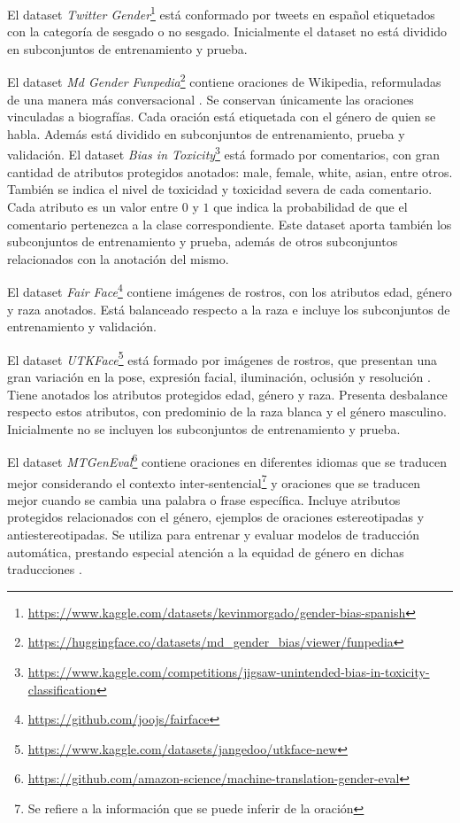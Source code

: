     El dataset \textit{Twitter Gender}\footnote{\url{https://www.kaggle.com/datasets/kevinmorgado/gender-bias-spanish}} est\'a conformado por 
    tweets en espa\~nol etiquetados con la categor\'ia de sesgado o no sesgado. Inicialmente el dataset no est\'a dividido en subconjuntos de 
    entrenamiento y prueba.

    El dataset \textit{Md Gender Funpedia}\footnote{\url{https://huggingface.co/datasets/md_gender_bias/viewer/funpedia}} contiene oraciones de 
    Wikipedia, reformuladas de una manera m\'as conversacional \parencite{dinan2020multidimensional}. Se conservan \'unicamente las oraciones 
    vinculadas a biograf\'ias. Cada oraci\'on est\'a etiquetada con el g\'enero de quien se habla. Adem\'as est\'a dividido en subconjuntos de 
    entrenamiento, prueba y validaci\'on.
    El dataset \textit{Bias in Toxicity}\footnote{\url{https://www.kaggle.com/competitions/jigsaw-unintended-bias-in-toxicity-classification}}
    est\'a formado por comentarios, con gran cantidad de atributos protegidos anotados: male, female, white, asian, entre otros. Tambi\'en se 
    indica el nivel de toxicidad y toxicidad severa de cada comentario. Cada atributo es un valor entre $0$ y $1$ que indica la probabilidad de 
    que el comentario pertenezca a la clase correspondiente. Este dataset aporta tambi\'en los subconjuntos de entrenamiento y prueba, adem\'as 
    de otros subconjuntos relacionados con la anotaci\'on del mismo.  

    El dataset \textit{Fair Face}\footnote{\url{https://github.com/joojs/fairface}} contiene im\'agenes de rostros, con los atributos edad, 
    g\'enero y raza anotados. Est\'a balanceado respecto a la raza \parencite{karkkainenfairface} e incluye los subconjuntos de entrenamiento y 
    validaci\'on.

    El dataset \textit{UTKFace}\footnote{\url{https://www.kaggle.com/datasets/jangedoo/utkface-new}} est\'a formado por im\'agenes de rostros, que 
    presentan una gran variaci\'on en la pose, expresi\'on facial, iluminaci\'on, oclusi\'on y resoluci\'on \parencite{zhang2017age}. 
    Tiene anotados los atributos protegidos edad, g\'enero y raza. Presenta desbalance respecto estos atributos, con predominio de la raza 
    blanca y el g\'enero masculino. Inicialmente no se incluyen los subconjuntos de entrenamiento y prueba.

    El dataset \textit{MTGenEval}\footnote{\url{https://github.com/amazon-science/machine-translation-gender-eval}} contiene oraciones en 
    diferentes idiomas que se traducen mejor considerando el contexto inter-sentencial\footnote{Se refiere a la informaci\'on que se puede 
    inferir de la oraci\'on} y oraciones que se traducen mejor cuando se cambia una palabra o frase espec\'ifica. Incluye atributos protegidos 
    relacionados con el g\'enero, ejemplos de oraciones estereotipadas y antiestereotipadas. Se utiliza para entrenar y evaluar modelos de 
    traducci\'on autom\'atica, prestando especial atenci\'on a la equidad de g\'enero en dichas traducciones \parencite{Currey2022}.

